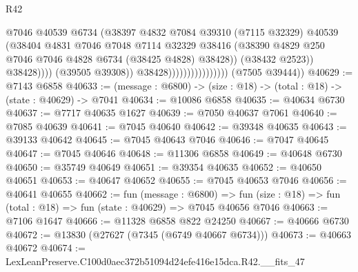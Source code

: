 \begin{lexlean}{R42}
\begin{coremodule}
{                                                @7046
                                                @40539
                                                @6734
                                                (@38397
                                                  @4832
                                                  @7084
                                                  @39310
                                                  (@7115 @32329)
                                                  @40539
                                                  (@38404
                                                    @4831
                                                    @7046
                                                    @7048
                                                    @7114
                                                    @32329
                                                    @38416
                                                    (@38390
                                                      @4829
                                                      @250
                                                      @7046
                                                      @7046
                                                      @4828
                                                      @6734
                                                      (@38425 @4828)
                                                      @38428))
                                                  (@38432 @2523))
                                                @38428))))
                                        (@39505 @39308))
                                      @38428))))))))))))))))
      (@7505 @39444))
@40629 := @7143 @6858
@40633 := (message : @6800) -> (size : @18) -> (total : @18) -> (state : @40629) -> @7041
@40634 := @10086 @6858
@40635 := @40634 @6730
@40637 := @7717 @40635 @1627
@40639 := @7050 @40637 @7061
@40640 := @7085 @40639
@40641 := @7045 @40640
@40642 := @39348 @40635
@40643 := @39133 @40642
@40645 := @7045 @40643 @7046
@40646 := @7047 @40645
@40647 := @7045 @40646
@40648 := @11306 @6858
@40649 := @40648 @6730
@40650 := @35749 @40649
@40651 := @39354 @40635
@40652 := @40650 @40651
@40653 := @40647 @40652
@40655 := @7045 @40653 @7046
@40656 := @40641 @40655
@40662 := fun (message : @6800) =>
  fun (size : @18) => fun (total : @18) => fun (state : @40629) => @7045 @40656 @7046
@40663 := @7106 @1647
@40666 := @11328 @6858 @822 @24250
@40667 := @40666 @6730
@40672 := @13830 (@27627 (@7345 (@6749 @40667 @6734)))
@40673 := @40663 @40672
@40674 := LexLeanPreserve.C100d0aec372b51094d24efe416e15dca.R42.__fits_47
}
\end{coremodule}
\end{lexlean}

